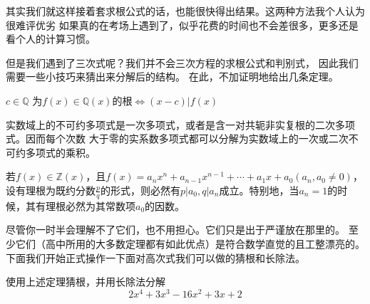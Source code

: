 其实我们就这样接着套求根公式的话，也能很快得出结果。这两种方法我个人认为很难评优劣
如果真的在考场上遇到了，似乎花费的时间也不会差很多，更多还是看个人的计算习惯。

但是我们遇到了三次式呢？我们并不会三次方程的求根公式和判别式，
因此我们需要一些小技巧来猜出来分解后的结构。
在此，不加证明地给出几条定理。

\begin{theorem}
   $ c\in \mathbb{Q}$ 为$f(x) \in \mathbb{Q} (x)$的根$\Leftrightarrow (x-c)|f(x)$
\end{theorem}
\begin{theorem}
    实数域上的不可约多项式是一次多项式，或者是含一对共轭非实复根的二次多项式。因而每个次数
    大于零的实系数多项式都可以分解为实数域上的一次或二次不可约多项式的乘积。
\end{theorem}
\begin{theorem}
若$f(x)\in \mathbb{Z} (x)$，且$f(x)=a_nx^n+a_{n-1}x^{n-1}+\cdots+a_1x+a_0(a_n,a_0\neq 0)$，
设有理根为既约分数$\frac{p}{q}$的形式，则必然有$p|a_0,q|a_n$成立。特别地，当$a_n=1$的时候，其有理根必然为其常数项$a_0$的因数。
\end{theorem}

尽管你一时半会理解不了它们，也不用担心。它们只是出于严谨放在那里的。
至少它们（高中所用的大多数定理都有如此优点）是符合数学直觉的且工整漂亮的。
下面我们开始正式操作一下面对高次式我们可以做的猜根和长除法。
\begin{example}
    使用上述定理猜根，并用长除法分解
    \[2x^4+3x^3-16x^2+3x+2\]
\end{example}

